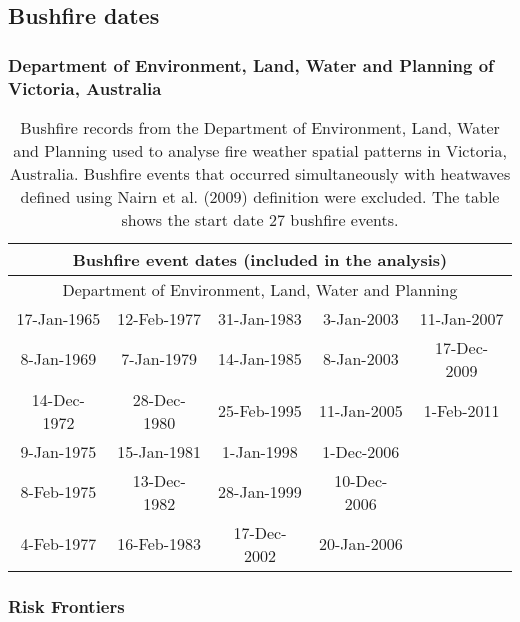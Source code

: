 \subsection{Bushfire dates }


\subsubsection{Department of Environment, Land, Water and Planning of Victoria,
Australia }

\begin{table}[H]
\caption{Bushfire records from the Department of Environment, Land, Water and
Planning used to analyse fire weather spatial patterns in Victoria,
Australia. Bushfire events that occurred simultaneously with heatwaves
defined using Nairn et al. (2009) definition were excluded. The table
shows the start date 27 bushfire events. \label{tab:Bushfire records from the Department of Environment, Land, Water and Planning used to analyse fire weather spatial patterns in Victoria, Australia}}


\centering{}%
\begin{tabular}{|c|c|c|c|c|}
\hline 
\multicolumn{5}{|c|}{\textbf{Bushfire event dates (included in the analysis)}}\tabularnewline
\hline 
\multicolumn{5}{|c|}{Department of Environment, Land, Water and Planning}\tabularnewline
\hline 
\hline 
17-Jan-1965 & 12-Feb-1977 & 31-Jan-1983 & 3-Jan-2003 & 11-Jan-2007\tabularnewline
\hline 
8-Jan-1969 & 7-Jan-1979 & 14-Jan-1985 & 8-Jan-2003 & 17-Dec-2009\tabularnewline
\hline 
14-Dec-1972 & 28-Dec-1980 & 25-Feb-1995 & 11-Jan-2005 & 1-Feb-2011\tabularnewline
\hline 
9-Jan-1975 & 15-Jan-1981 & 1-Jan-1998 & 1-Dec-2006 & \tabularnewline
\hline 
8-Feb-1975 & 13-Dec-1982 & 28-Jan-1999 & 10-Dec-2006 & \tabularnewline
\hline 
4-Feb-1977 & 16-Feb-1983 & 17-Dec-2002 & 20-Jan-2006 & \tabularnewline
\hline 
\end{tabular}
\end{table}



\subsubsection{Risk Frontiers}

